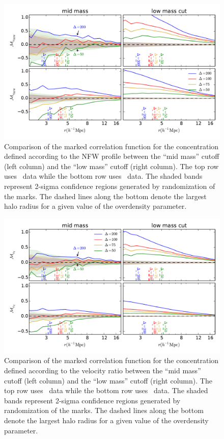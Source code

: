 \documentclass[usenatbib,usegraphicx,letterpaper]{mn2e}
\begin{document}
\begin{figure}
	\centering
	\includegraphics[width=.9\textwidth]{all_mcf_cnfw_z00_hostsvlow.pdf}
	\caption{Comparison of the marked correlation function for the concentration defined according to the NFW profile between the ``mid mass'' cutoff (left column) and the ``low mass'' cutoff (right column). The top row uses \simA \ data while the bottom row uses \simB \ data. The shaded bands represent 2-sigma confidence regions generated by randomization of the marks. The dashed lines along the bottom denote the largest halo radius for a given value of the overdensity parameter.}
	\label{fig:hvl_mcf_cnfw}
\end{figure}

\begin{figure}
	\centering
	\includegraphics[width=.9\textwidth]{all_mcf_cV_z00_hostsvlow.pdf}
	\caption{Comparison of the marked correlation function for the concentration defined according to the velocity ratio between the ``mid mass'' cutoff (left column) and the ``low mass'' cutoff (right column). The top row uses \simA \ data while the bottom row uses \simB \ data. The shaded bands represent 2-sigma confidence regions generated by randomization of the marks. The dashed lines along the bottom denote the largest halo radius for a given value of the overdensity parameter.}
	\label{fig:hvl_mcf_cV}
\end{figure}
\end{document}
